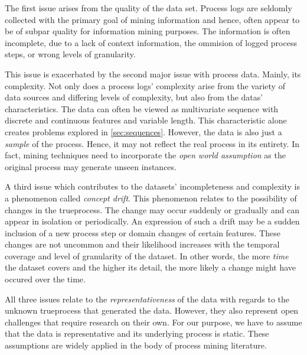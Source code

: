 \documentclass[./../../paper.tex]{subfiles}
\begin{document}
The first issue arises from the quality of the data set. Process logs are seldomly collected with the primary goal of mining information and hence, often appear to be of subpar quality for information mining purposes. The information is often incomplete, due to a lack of context information, the ommision of logged process steps, or wrong levels of granularity\autocite{vanderaalst_ProcessMiningManifesto_2012}.

This issue is exacerbated by the second major issue with process data. Mainly, its complexity. Not only does a process logs' complexity arise from the variety of data sources and differing levels of complexity, but also from the datas' characteristics. The data can often be viewed as multivariate sequence with discrete and continuous features and variable length. This characteristic alone creates problems explored in \autoref{sec:sequences}. However, the data is also just a \emph{sample} of the process. Hence, it may not reflect the real process in its entirety. In fact, mining techniques need to incorporate the \emph{open world assumption} as the original process may generate unseen \glspl{instance}\autocite{vanderaalst_ProcessMiningManifesto_2012}.

A third issue which contributes to the datasets' incompleteness and complexity is a phenomenon called \emph{concept drift}\autocite{vanderaalst_ProcessMiningManifesto_2012}. This phenomenon relates to the possibility of changes in the \gls{trueprocess}. The change may occur suddenly or gradually and can appear in isolation or periodically. An expression of such a drift may be a sudden inclusion of a new process step or domain changes of certain features. These changes are not uncommon and their likelihood increases with the temporal coverage and level of granularity of the dataset\autocite{vanderaalst_ProcessMiningManifesto_2012}. In other words, the more \emph{time} the dataset covers and the higher its detail, the more likely a change might have occured over the time.

All three issues relate to the \emph{representativeness} of the data with regards to the unknown \gls{trueprocess} that generated the data. However, they also represent open challenges that require research on their own. For our purpose, we have to assume that the data is representative and its underlying process is static. These assumptions are widely applied in the body of process mining literature\autocites{tax_PredictiveBusinessProcess_2017a,klimek_Longtermseriesforecasting_2021}.
\end{document}
